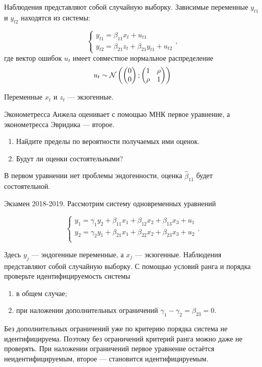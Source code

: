 \begin{problem}
Наблюдения представляют собой случайную выборку. Зависимые переменные $y_{t1}$ и $y_{t2}$ находятся из системы:

\[
\begin{cases}
y_{t1} = \beta_{11} x_t + u_{t1} \\
y_{t2} = \beta_{21} z_t + \beta_{21} y_{t1} + u_{t2}
\end{cases},
\]
где вектор ошибок $u_t$ имеет совместное нормальное распределение
\[
u_t \sim \mathcal{N}\left(
\begin{pmatrix}
  0 \\
  0
\end{pmatrix};
\begin{pmatrix}
  1 & \rho \\
  \rho & 1
\end{pmatrix}
\right)
\]

Переменные $x_t$ и $z_t$ — экзогенные. 

Эконометресса Анжела оценивает с помощью МНК первое уравнение, а эконометресса Эвридика — второе.
\begin{enumerate}
\item Найдите пределы по вероятности получаемых ими оценок.
\item Будут ли оценки состоятельными?
\end{enumerate}

\begin{sol}
  В первом уравнении нет проблемы эндогенности, оценка $\hat \beta_{11}$ будет состоятельной. 
\end{sol}
\end{problem}
  


\begin{problem}
Экзамен 2018-2019. Рассмотрим систему одновременных уравнений

\[
\begin{cases}
	y_1 = \gamma_1 y_2 + \beta_{11} x_{1} + \beta_{12} x_2 + \beta_{13} x_3  + u_1 \\
	y_2 = \gamma_2 y_1 + \beta_{21} x_{1} + \beta_{22} x_2 + \beta_{23} x_3  + u_2 \\
\end{cases}.
\]

Здесь $y_j$ — эндогенные переменные, а $x_j$ — экзогенные. Наблюдения представляют собой случайную выборку. 
С помощью условий ранга и порядка проверьте идентифицируемость системы

\begin{enumerate}
	\item в общем случае;
	\item при наложении дополнительных ограничений $\gamma_1 - \gamma_2 = \beta_{23} = 0$.
\end{enumerate}

\begin{sol}
  Без дополнительных ограничений уже по критерию порядка система не идентифицируема. 
  Поэтому без ограничений критерий ранга можно даже не проверять.
  При наложении ограничений первое уравнение остаётся неидентифицируемым, второе — становится идентифицируемым.
\end{sol}
\end{problem}


